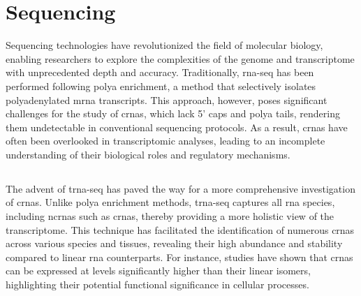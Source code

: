 \section{Sequencing }

Sequencing technologies have revolutionized the field of molecular biology,
enabling researchers to explore the complexities of the genome and
transcriptome with unprecedented depth and accuracy.
Traditionally, \gls{rna-seq} has been performed following \gls{polya}
enrichment, a method that selectively isolates polyadenylated \gls{mrna}
transcripts.
This approach, however, poses significant challenges for the study of
\glspl{crna}, which lack 5' caps and \gls{polya} tails, rendering them
undetectable in conventional sequencing protocols\supercite{guo_expanded_2014}.
As a result, \glspl{crna} have often been overlooked in transcriptomic
analyses, leading to an incomplete understanding of their biological roles and
regulatory mechanisms.

\subsection{}
The advent of \gls{trna-seq} has paved the way for a more comprehensive
investigation of \glspl{crna}.
Unlike \gls{polya} enrichment methods, \gls{trna-seq} captures all \gls{rna}
species, including \glspl{ncrna} such as \glspl{crna}, thereby providing a more
holistic view of the transcriptome\supercite{panda_identification_2017}.
This technique has facilitated the identification of numerous \glspl{crna}
across various species and tissues, revealing their high abundance and
stability compared to linear \gls{rna}
counterparts\supercite{liu_circular_2016,cao_expression_2018}.
For instance, studies have shown that \glspl{crna} can be expressed at levels
significantly higher than their linear isomers, highlighting their potential
functional significance in cellular processes\supercite{liu_circular_2016}.
